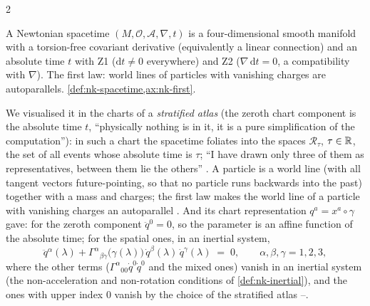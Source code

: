 \begin{paracol}{2}
\begin{recall}
A Newtonian spacetime $(M,\mathcal O,\mathcal A,\nabla,t)$ is a four-dimensional smooth manifold with a torsion-free covariant derivative (equivalently a linear connection) and an absolute
time $t$ with Z1 ($\mathrm dt\ne0$ everywhere) and Z2 ($\nabla\,\mathrm dt=0$, a compatibility with $\nabla$). The first law: world lines of particles with vanishing charges are autoparallels.
\cref{def:nk-spacetime,ax:nk-first}.
\end{recall}
We visualised it in the charts of a \emph{stratified atlas} (the zeroth chart component is the absolute time $t$, ``physically nothing is in it, it is a pure simplification of the computation''): in such a chart the spacetime foliates into the spaces
$\mathcal R_\tau$, $\tau\in\mathbb{R}$, the set of all events whose absolute time is $\tau$; ``I have drawn only three of them as representatives, between them lie the others'' . A particle is a world line (with all tangent vectors
future-pointing, so that no particle runs backwards into the past) together with a mass and charges; the first law makes the world line of a particle with vanishing charges an autoparallel . And its
chart representation $q^a=x^a\circ\gamma$ gave: for the zeroth component $\ddot q^0=0$, so the parameter is an affine function of the absolute time; for the spatial ones, in an inertial system,
\begin{equation}\label{eq:as-autopar}
  \ddot q^\alpha(\lambda)+\Gamma^\alpha{}_{\beta\gamma}\bigl(\gamma(\lambda)\bigr)\,\dot q^\beta(\lambda)\,\dot q^\gamma(\lambda)\;=\;0 ,\qquad\alpha,\beta,\gamma=1,2,3 ,
\end{equation}
where the other terms ($\Gamma^\alpha{}_{00}\dot q^0\dot q^0$ and the mixed ones) vanish in an inertial system (the non-acceleration and non-rotation conditions of \cref{def:nk-inertial}), and the ones with upper index $0$ vanish by the choice of the stratified atlas
--.


\end{paracol}
